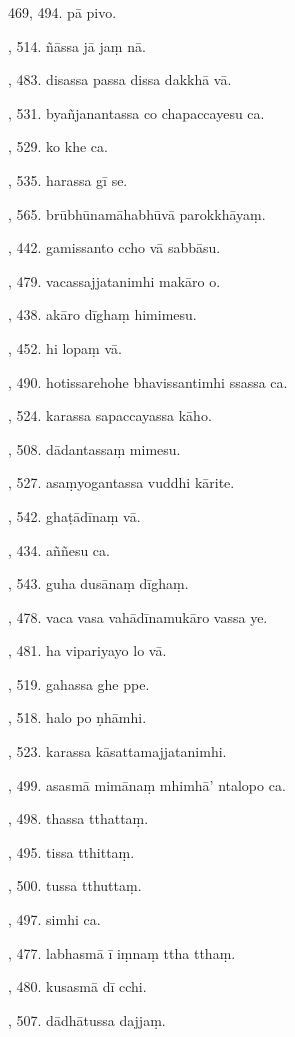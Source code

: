 469, 494. pā pivo.\par {}, 514. ñāssa jā jaṃ nā.\par {}, 483. disassa passa dissa dakkhā vā.\par {}, 531. byañjanantassa co chapaccayesu ca.\par {}, 529. ko khe ca.\par {}, 535. harassa gī se.\par {}, 565. brūbhūnamāhabhūvā parokkhāyaṃ.\par {}, 442. gamissanto ccho vā sabbāsu.\par {}, 479. vacassajjatanimhi makāro o.\par {}, 438. akāro dīghaṃ himimesu.\par {}, 452. hi lopaṃ vā.\par {}, 490. hotissarehohe bhavissantimhi ssassa ca.\par {}, 524. karassa sapaccayassa kāho.\par {}, 508. dādantassaṃ mimesu.\par {}, 527. asaṃyogantassa vuddhi kārite.\par {}, 542. ghaṭādīnaṃ vā.\par {}, 434. aññesu ca.\par {}, 543. guha dusānaṃ dīghaṃ.\par {}, 478. vaca vasa vahādīnamukāro vassa ye.\par {}, 481. ha vipariyayo lo vā.\par {}, 519. gahassa ghe ppe.\par {}, 518. halo po ṇhāmhi.\par {}, 523. karassa kāsattamajjatanimhi.\par {}, 499. asasmā mimānaṃ mhimhā’ ntalopo ca.\par {}, 498. thassa tthattaṃ.\par {}, 495. tissa tthittaṃ.\par {}, 500. tussa tthuttaṃ.\par {}, 497. simhi ca.\par {}, 477. labhasmā ī iṃnaṃ ttha tthaṃ.\par {}, 480. kusasmā dī cchi.\par {}, 507. dādhātussa dajjaṃ.\par \noindent
